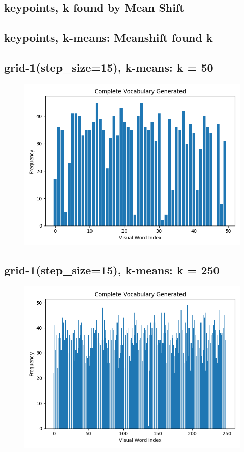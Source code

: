 \subsection*{keypoints, k found by Mean Shift}
\subsection*{keypoints, k-means: Meanshift found k}

\subsection*{grid-1(step\_size=15), k-means: k = 50}
\begin{figure}[H]
    \centering
    \includegraphics[width=\textwidth]{images/bow-stp-15-50.png}
\end{figure}

\subsection*{grid-1(step\_size=15), k-means: k = 250}
\begin{figure}[H]
    \centering
    \includegraphics[width=\textwidth]{images/bow-stp-15-250.png}
\end{figure}

